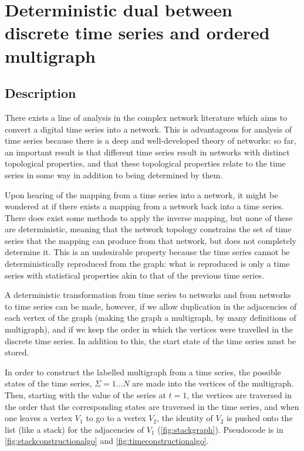 \documentclass[12pt]{article}
\begin{document}
\section{Deterministic dual between discrete time series and ordered multigraph}

\subsection{Description}

There exists a line of analysis in the complex network literature which aims to convert a digital time series into a network. This is advantageous for analysis of time series because there is a deep and well-developed theory of networks: so far, an important result is that different time series result in networks with distinct topological properties, and that these topological properties relate to the time series in some way in addition to being determined by them\cite{campanharo}.


Upon hearing of the mapping from a time series into a network, it might be wondered at if there exists a mapping from a network back into a time series. There does exist some methods to apply the inverse mapping, but none of these are deterministic, meaning that the network topology constrains the set of time series that the mapping can produce from that network, but does not completely determine it\cite{campanharo}. This is an undesirable property because the time series cannot be deterministically reproduced from the graph: what is reproduced is only a time series with statistical properties akin to that of the previous time series.

A deterministic transformation from time series to networks and from networks to time series can be made, however, if we allow duplication in the adjacencies of each vertex of the graph (making the graph a multigraph, by many definitions of multigraph\cite{multigraph}), and if we keep the order in which the vertices were travelled in the discrete time series. In addition to this, the start state of the time series must be stored.

In order to construct the labelled multigraph from a time series, the possible states of the time series, $\Sigma = {1 ... N}$ are made into the vertices of the multigraph. Then, starting with the value of the series at $t =1$, the vertices are traversed in the order that the corresponding states are traversed in the time series, and when one leaves a vertex $V_1$ to go to a vertex $V_2$, the identity of $V_2$ is pushed onto the list (like a stack) for the adjacencies of $V_1$ (\ref{fig:stackgraph}). Pseudocode is in \ref{fig:stackconstructionalgo} and \ref{fig:timeconstructionalgo}.
\end{document}
